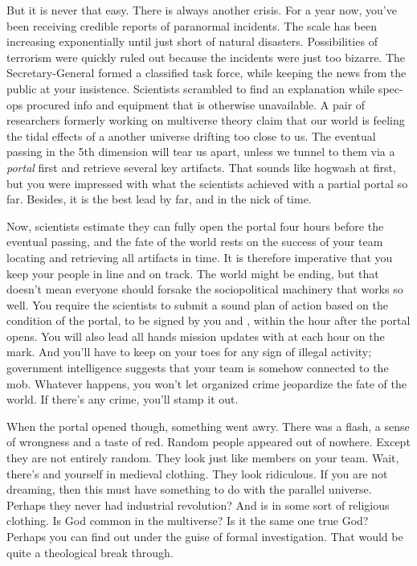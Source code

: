 \documentclass[char]{guildcamp3}
\begin{document}
But it is never that easy. There is always another crisis. For a year now, you've been receiving credible reports of paranormal incidents. The scale has been increasing exponentially until just short of natural disasters. Possibilities of terrorism were quickly ruled out because the incidents were just too bizarre. The Secretary-General formed a classified task force, while keeping the news from the public at your insistence. Scientists scrambled to find an explanation while spec-ops procured info and equipment that is otherwise unavailable. A pair of researchers formerly working on multiverse theory claim that our world is feeling the tidal effects of a another universe drifting too close to us. The eventual passing in the 5th dimension will tear us apart, unless we tunnel to them via a \emph{portal} first and retrieve several key artifacts. That sounds like hogwash at first, but you were impressed with what the scientists achieved with a partial portal so far. Besides, it is the best lead by far, and in the nick of time. 

Now, scientists estimate they can fully open the portal four hours before the eventual passing, and the fate of the world rests on the success of your team locating and retrieving all artifacts in time. It is therefore imperative that you keep your people in line and on track. The world might be ending, but that doesn't mean everyone should forsake the sociopolitical machinery that works so well. You require the scientists to submit a sound plan of action based on the condition of the portal, to be signed by you and \cPoliTwo{}, within the hour after the portal opens. You will also lead all hands mission updates with \cPoliTwo{} at each hour on the mark. And you'll have to keep on your toes for any sign of illegal activity; government intelligence suggests that your team is somehow connected to the mob. Whatever happens, you won't let organized crime jeopardize the fate of the world. If there's any crime, you'll stamp it out.

When the portal opened though, something went awry. There was a flash, a sense of wrongness and a taste of red. Random people appeared out of nowhere. Except they are not entirely random. They look just like members on your team. Wait, there's \cPoliTwo{} and yourself in medieval clothing. They look ridiculous. If you are not dreaming, then this must have something to do with the parallel universe. Perhaps they never had industrial revolution? And \cTech{} is in some sort of religious clothing. Is God common in the multiverse? Is it the same one true God? Perhaps you can find out under the guise of formal investigation. That would be quite a theological break through.
\end{document}
